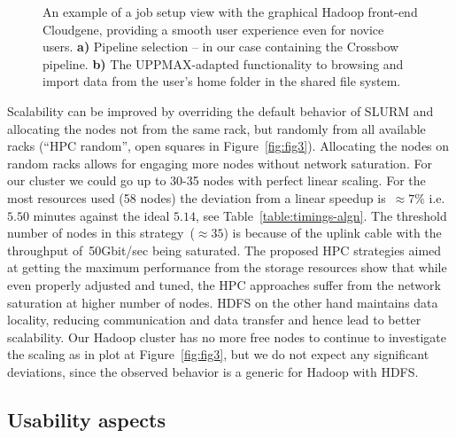 \documentclass{bioinfo}
\begin{document}
\begin{figure}
\begin{subfigure}[b]{0.36\textwidth}
		\subcaption{}
	\end{subfigure}
	\caption{%
	An example of a job setup view with the graphical Hadoop front-end Cloudgene,
	providing a smooth user experience even for novice users. \textbf{a)} Pipeline
	selection -- in our case containing the Crossbow pipeline. \textbf{b)} The
	UPPMAX-adapted functionality to browsing and import data from the user's home
	folder in the shared file system.
	}
	\label{fig:fig4}
\end{figure}


Scalability can be improved by overriding the default behavior of SLURM and allocating the nodes not from the same rack, but randomly from all available racks (``HPC random'', open squares in Figure~\ref{fig:fig3}). Allocating the nodes on random racks allows for engaging more nodes without network saturation. For our cluster we could go up to 30-35 nodes with perfect linear scaling. For the most resources used (58 nodes) the deviation from a linear speedup is~$\approx 7\%$ i.e. $5.50$ minutes against the ideal $5.14$, see Table~\ref{table:timings-algn}. The threshold number of nodes in this strategy~($\approx35$) is because of the uplink cable with the throughput of~50Gbit/sec being saturated. 
The proposed HPC strategies aimed at getting the maximum performance from the storage resources show that while even properly adjusted and tuned, the HPC approaches suffer from the network saturation at higher number of nodes.
HDFS on the other hand maintains data locality, reducing communication and data transfer and hence lead to better scalability.
Our Hadoop cluster has no more free nodes to continue to investigate the scaling as in plot at Figure~\ref{fig:fig3}, but we do not expect any significant deviations, since the observed behavior is a generic for Hadoop with HDFS\citep{lin2010, Hadoop:Guide}. 




\subsection*{Usability aspects}
\label{subsectionIV_2}
\end{document}
